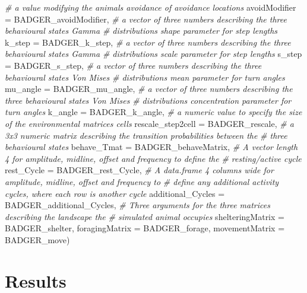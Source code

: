 \documentclass[10pt,a4paper]{article}
\newenvironment{Shaded}{}{}
\newcommand{\AttributeTok}[1]{#1}
\newcommand{\CommentTok}[1]{\textit{#1}}
\newcommand{\NormalTok}[1]{#1}
\begin{document}
\begin{Shaded}
\begin{Highlighting}[]
  \CommentTok{\# a value modifying the animal\textquotesingle{}s avoidance of avoidance locations}
  \AttributeTok{avoidModifier =}\NormalTok{ BADGER\_avoidModifier,}
  \CommentTok{\# a vector of three numbers describing the three behavioural state\textquotesingle{}s Gamma}
  \CommentTok{\# distributions\textquotesingle{} shape parameter for step lengths}
  \AttributeTok{k\_step =}\NormalTok{ BADGER\_k\_step,}
  \CommentTok{\# a vector of three numbers describing the three behavioural state\textquotesingle{}s Gamma}
  \CommentTok{\# distributions\textquotesingle{} scale parameter for step lengths}
  \AttributeTok{s\_step =}\NormalTok{ BADGER\_s\_step,}
  \CommentTok{\# a vector of three numbers describing the three behavioural state\textquotesingle{}s Von Mises}
  \CommentTok{\# distributions\textquotesingle{} mean parameter for turn angles}
  \AttributeTok{mu\_angle =}\NormalTok{ BADGER\_mu\_angle,}
  \CommentTok{\# a vector of three numbers describing the three behavioural state\textquotesingle{}s Von Mises}
  \CommentTok{\# distributions\textquotesingle{} concentration parameter for turn angles}
  \AttributeTok{k\_angle =}\NormalTok{ BADGER\_k\_angle,}
  \CommentTok{\# a numeric value to specify the size of the environmental matrices cells}
  \AttributeTok{rescale\_step2cell =}\NormalTok{ BADGER\_rescale,}
  \CommentTok{\# a 3x3 numeric matrix describing the transition probabilities between the}
  \CommentTok{\# three behavioural states}
  \AttributeTok{behave\_Tmat =}\NormalTok{ BADGER\_behaveMatrix,}
  \CommentTok{\# A vector length 4 for amplitude, midline, offset and frequency to define the}
  \CommentTok{\# resting/active cycle}
  \AttributeTok{rest\_Cycle =}\NormalTok{ BADGER\_rest\_Cycle,}
  \CommentTok{\# A data.frame 4 columns wide for amplitude, midline, offset and frequency to}
  \CommentTok{\# define any additional activity cycles, where each row is another cycle}
  \AttributeTok{additional\_Cycles =}\NormalTok{ BADGER\_additional\_Cycles,}
  \CommentTok{\# Three arguments for the three matrices describing the landscape the}
  \CommentTok{\# simulated animal occupies}
  \AttributeTok{shelteringMatrix =}\NormalTok{ BADGER\_shelter,}
  \AttributeTok{foragingMatrix =}\NormalTok{ BADGER\_forage,}
  \AttributeTok{movementMatrix =}\NormalTok{ BADGER\_move)}
\end{Highlighting}
\end{Shaded}

\hypertarget{results}{%
\section{Results}\label{results}}
\end{document}
